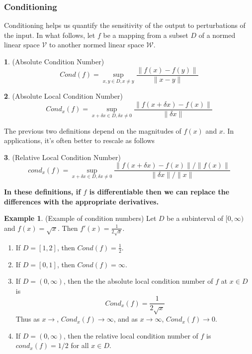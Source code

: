 \documentclass[12pt]{article}
\theoremstyle{definition}
\newtheorem{definition}{\color{NavyBlue}{\textbf{Definition}}}
\newcommand{\norm}[1]{\lVert#1\rVert}
\newtheorem{example}{\color{WildStrawberry}Example}
\theoremstyle{definition}
\begin{document}
\subsubsection{Conditioning}
Conditioning helps us quantify the sensitivity of the output to perturbations of the input. In what follows, let $f$ be a mapping from a subset $D$ of a normed linear space $\mathcal{V}$ to another normed linear space $\mathcal{W}$. 
\begin{definition}(Absolute Condition Number)
\begin{equation}
	Cond(f) = \sup_{x,y \in D, x\neq y} \frac{\norm{f(x) - f(y)}}{\norm{x - y}}
\end{equation}
\end{definition}

\begin{definition}(Absolute Local Condition Number)
\begin{equation}
	Cond_x(f) = \sup_{x + \delta x \in D, \delta x \neq 0} \frac{\norm{f(x + \delta x) - f(x)}}{\norm{\delta x}}
\end{equation}
\end{definition}

The previous two definitions depend on the magnitudes of $f(x)$ and $x$. In applications, it's often better to rescale as follows
\begin{definition}(Relative Local Condition Number)
\begin{equation}
	cond_x(f) = \sup_{x + \delta x \in D, \delta x \neq 0} \frac{\norm{f(x + \delta x) - f(x)} / \norm{f(x)}}{\norm{\delta x} / \norm{x}}
\end{equation}
\end{definition}

\textbf{In these definitions, if $f$ is differentiable then we can replace the differences with the appropriate derivatives.} 

\begin{example}(Example of condition numbers)
Let $D$ be a subinterval of $[0, \infty)$ and $f(x) = \sqrt{x}$. Then $f'(x) = \frac{1}{2 \sqrt{x}}$. 
\begin{enumerate}
	\item If $D = [1,2]$, then $Cond(f) = \frac{1}{2}$.
	\item If $D = [0, 1]$, then $Cond(f) = \infty$.
	\item If $D = (0, \infty)$, then the the absolute local condition number of $f$ at $x \in D$ is 
	\begin{equation}
		Cond_x(f) = \frac{1}{2 \sqrt{x}}
	\end{equation}
	Thus as $x \to $, $Cond_x(f) \to \infty$, and as $x \to \infty$, $Cond_x(f) \to 0$.
	\item If $D = (0, \infty)$, then the relative local condition number of $f$ is $cond_x(f) = 1/2$ for all $x \in D$. 
\end{enumerate}
\end{example}
\end{document}
